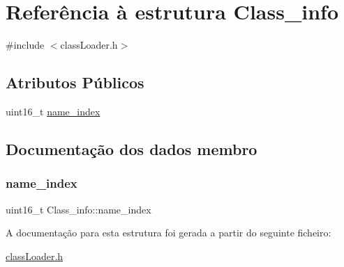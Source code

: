 \hypertarget{struct_class__info}{}\section{Referência à estrutura Class\+\_\+info}
\label{struct_class__info}


{\ttfamily \#include $<$class\+Loader.\+h$>$}

\subsection*{Atributos Públicos}
\begin{DoxyCompactItemize}
\item 
uint16\+\_\+t \hyperlink{struct_class__info_ab624f31e2f7936f1faad866383525668}{name\+\_\+index}
\end{DoxyCompactItemize}


\subsection{Documentação dos dados membro}
\hypertarget{struct_class__info_ab624f31e2f7936f1faad866383525668}{}\label{struct_class__info_ab624f31e2f7936f1faad866383525668} 
\subsubsection{\texorpdfstring{name\+\_\+index}{name\_index}}
{\footnotesize\ttfamily uint16\+\_\+t Class\+\_\+info\+::name\+\_\+index}



A documentação para esta estrutura foi gerada a partir do seguinte ficheiro\+:\begin{DoxyCompactItemize}
\item 
\hyperlink{class_loader_8h}{class\+Loader.\+h}\end{DoxyCompactItemize}
